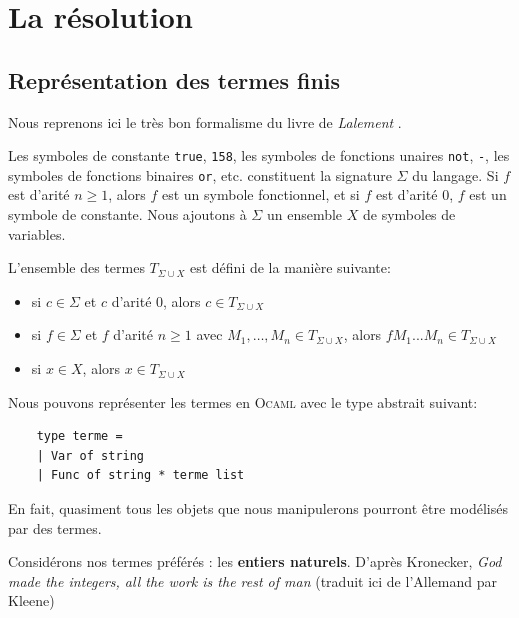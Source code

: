 \chapter{La résolution}
\section{Représentation des termes finis}
Nous reprenons ici le très bon formalisme du livre de \textit{Lalement} \cite{lalement}.


Les symboles de constante \texttt{true}, \texttt{158}, les symboles de fonctions unaires \texttt{not}, \texttt{-},
les symboles de fonctions binaires \texttt{or}, etc. constituent la signature $\Sigma$ du langage.
Si $f$ est d'arité $n \geq 1$, alors $f$ est un symbole fonctionnel, et si $f$ est d'arité $0$, $f$ est un symbole de constante.
Nous ajoutons à $\Sigma$ un ensemble $X$ de symboles de variables.

L'ensemble des termes $T_{\Sigma \cup X}$ est défini de la manière suivante:
\begin{itemize}
	\item si $c \in \Sigma$ et $c$ d'arité $0$, alors $c \in T_{\Sigma \cup X}$ 
	\item si $f \in \Sigma$ et $f$ d'arité $n \geq  1$ avec $M_1, \dots, M_n \in T_{\Sigma \cup X}$, alors $f M_1 ... M_n \in T_{\Sigma \cup X}$
	\item si $x \in X$, alors $x \in T_{\Sigma \cup X}$
\end{itemize}

Nous pouvons représenter les termes en \textsc{Ocaml} avec le type abstrait suivant:
\begin{verbatim}
	type terme = 
	| Var of string
	| Func of string * terme list
\end{verbatim}
En fait, quasiment tous les objets que nous manipulerons pourront être modélisés par des termes.

\vspace{.5cm}
Considérons nos termes préférés : les \textbf{entiers naturels}. 
D'après Kronecker, \textit{God made the integers, all the work is the rest of man}
(traduit ici de l'Allemand par Kleene\cite{meta})


